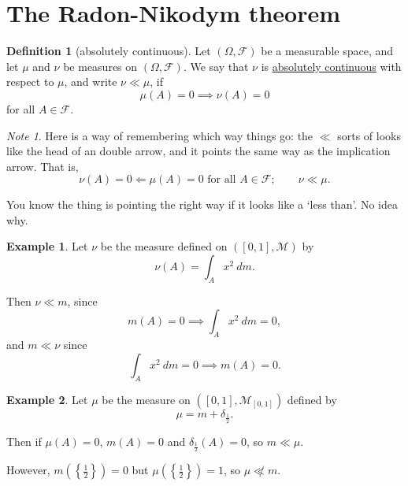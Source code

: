 \documentclass[a4paper,12pt]{scrreprt}
\newcommand{\defn}[1]{\ul{#1}}
\theoremstyle{definition}
\newtheorem{definition}{Definition}[section]
\newtheorem{example}{Example}[section]
\theoremstyle{plain}
\theoremstyle{remark}
\newtheorem{note}{Note}[section]
\begin{document}
\section{The Radon-Nikodym theorem}
\begin{definition}[absolutely continuous]
  \label{def:absolutelycontinuous}
  Let $(\Omega, \mathcal{F})$ be a measurable space, and let $\mu$ and $\nu$ be measures on $(\Omega, \mathcal{F})$. We say that $\nu$ is \defn{absolutely continuous} with respect to $\mu$, and write $\nu \ll \mu$, if
  \begin{equation*}
    \mu(A) = 0 \implies \nu(A) = 0
  \end{equation*}
  for all $A \in \mathcal{F}$.
\end{definition}

\begin{note}
  Here is a way of remembering which way things go: the $\ll$ sorts of looks like the head of an double arrow, and it points the same way as the implication arrow. That is,
  \begin{equation*}
    \nu(A) = 0 \Longleftarrow \mu(A) = 0 \text{ for all }A \in \mathcal{F};\qquad \nu \ll \mu.
  \end{equation*}

  You know the thing is pointing the right way if it looks like a `less than'. No idea why.
\end{note}

\begin{example}
  Let $\nu$ be the measure defined on $([0, 1], \mathcal{M})$ by
  \begin{equation*}
    \nu(A) = \int_{A} x^{2}\ dm.
  \end{equation*}

  Then $\nu \ll m$, since
  \begin{equation*}
    m(A) = 0 \implies \int_{A} x^{2}\ dm = 0,
  \end{equation*}
  and $m \ll \nu$ since
  \begin{equation*}
    \int_{A} x^{2}\ dm = 0 \implies m(A) = 0.
  \end{equation*}
\end{example}

\begin{example}
  Let $\mu$ be the measure on $([0, 1], \mathcal{M}_{[0, 1]})$ defined by
  \begin{equation*}
    \mu = m + \delta_{\frac{1}{2}}.
  \end{equation*}

  Then if $\mu(A) = 0$, $m(A) = 0$ and $\delta_{\frac{1}{2}}(A) = 0$, so $m \ll \mu$.

  However, $m\left( \left\{ \frac{1}{2} \right\} \right) = 0$ but $\mu\left( \left\{ \frac{1}{2} \right\} \right) = 1$, so $\mu \not\ll m$.
\end{example}
\end{document}
